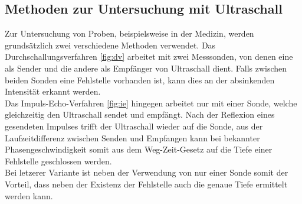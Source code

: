 \subsection{Methoden zur Untersuchung mit Ultraschall}
Zur Untersuchung von Proben, beispielsweise in der Medizin, werden grundsätzlich zwei verschiedene Methoden verwendet.
Das Durchschallungsverfahren \ref{fig:dv} arbeitet mit zwei Messsonden, von denen eine als Sender und die andere als Empfänger von Ultraschall dient.
Falls zwischen beiden Sonden eine Fehlstelle vorhanden ist, kann dies an der absinkenden Intensität erkannt werden.\\
Das Impuls-Echo-Verfahren \ref{fig:ie} hingegen arbeitet nur mit einer Sonde, welche gleichzeitig den Ultraschall sendet und empfängt.
Nach der Reflexion eines gesendeten Impulses trifft der Ultraschall wieder auf die Sonde, aus der Laufzeitdifferenz zwischen Senden und Empfangen kann bei bekannter Phasengeschwindigkeit somit aus dem Weg-Zeit-Gesetz auf die Tiefe einer Fehlstelle geschlossen werden.\\
Bei letzerer Variante ist neben der Verwendung von nur einer Sonde somit der Vorteil, dass neben der Existenz der Fehlstelle auch die genaue Tiefe ermittelt werden kann.



